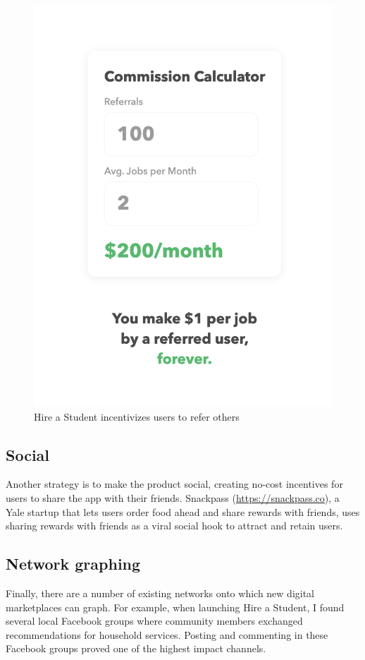 \begin{figure}[ht!]
\begin{center}
\includegraphics[scale=0.5]{figures/referral.png}
\end{center}
\caption[Example Referral Mechanism]{Hire a Student incentivizes users to refer others}
\label{referral}
\end{figure}

\subsection{Social}

Another strategy is to make the product social, creating no-cost incentives for users to share the app with their friends. Snackpass (\url{https://snackpass.co}), a Yale startup that lets users order food ahead and share rewards with friends, uses sharing rewards with friends as a viral social hook to attract and retain users.

\subsection{Network graphing}

Finally, there are a number of existing networks onto which new digital marketplaces can graph. For example, when launching Hire a Student, I found several local Facebook groups where community members exchanged recommendations for household services. Posting and commenting in these Facebook groups proved one of the highest impact channels.

